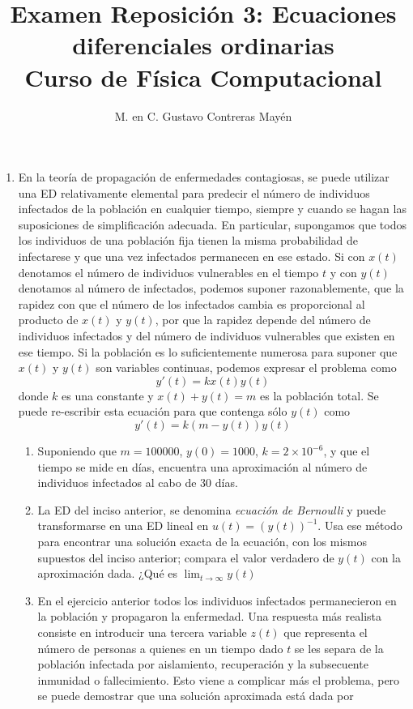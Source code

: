 \documentclass[11pt]{article}
\title{Examen Reposición 3: Ecuaciones diferenciales ordinarias \\ Curso de Física Computacional}
\author{M. en C. Gustavo Contreras Mayén}
\date{ }
\begin{document}
\maketitle
\fontsize{14}{14}\selectfont
\begin{enumerate}
\item En la teoría de propagación de enfermedades contagiosas, se puede utilizar una ED relativamente elemental para predecir el número de individuos infectados de la población en cualquier tiempo, siempre y cuando se hagan las suposiciones de simplificación adecuada. En particular, supongamos que todos los individuos de una población fija tienen la misma probabilidad de infectarese y que una vez infectados permanecen en ese estado. Si con $x(t)$ denotamos el número de individuos vulnerables en el tiempo $t$ y con $y(t)$ denotamos al número de infectados, podemos suponer razonablemente, que la rapidez con que el número de los infectados cambia es proporcional al producto de $x(t)$ y $y(t)$, por que la rapidez depende del número de individuos infectados y del número de individuos vulnerables que existen en ese tiempo. Si la población es lo suficientemente numerosa para suponer que $x(t)$ y $y(t)$ son variables continuas, podemos expresar el problema como
\[y'(t) = k x(t) y(t)\]
donde $k$ es una constante y $x(t)+ y(t) = m$ es la población total. Se puede re-escribir esta ecuación para que contenga sólo $y(t)$ como
\[ y'(t) = k (m-y(t)) y(t)\]
\begin{enumerate}
\item Suponiendo que $m=100000$, $y(0)=1000$, $k=2 \times 10^{-6}$, y que el tiempo se mide en días, encuentra una aproximación al número de individuos infectados al cabo de 30 días.
\item La ED del inciso anterior, se denomina \emph{ecuación de Bernoulli} y puede transformarse en una ED lineal en $u(t) = (y(t))^{-1}$. Usa ese método para encontrar una solución exacta de la ecuación, con los mismos supuestos del inciso anterior; compara el valor verdadero de $y(t)$ con la aproximación dada. ¿Qué es $\displaystyle\lim_{t \rightarrow \infty} y(t)$
\item En el ejercicio anterior todos los individuos infectados permanecieron en la población y propagaron la enfermedad. Una respuesta más realista consiste en introducir una tercera variable $z(t)$ que representa el número de personas a quienes en un tiempo dado $t$ se les separa de la población infectada por aislamiento, recuperación y la subsecuente inmunidad o fallecimiento. Esto viene a complicar más el problema, pero se puede demostrar que una solución aproximada está dada por

\end{enumerate}
\end{enumerate}
\end{document}
